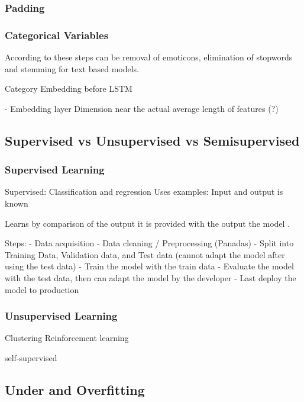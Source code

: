 \subsubsection{Padding}


\subsubsection{Categorical Variables}

According to \cite{alam2019impact} these steps can be removal of emoticons, elimination of stopwords and stemming for text based models.

Category Embedding before LSTM


- Embedding layer
Dimension near the actual average length of features (?)

\subsection{Supervised vs Unsupervised vs Semisupervised}

\subsubsection{Supervised Learning}
Supervised: Classification and regression
Uses  examples: Input and output is known

Learns by comparison of the output it is provided with the output the model .

Steps:
- Data acquisition
- Data cleaning / Preprocessing (Panadas)
- Split into Training Data, Validation data, and Test data (cannot adapt the model after using the test data)
- Train the model with the train data
- Evaluate the model with the test data, then can adapt the model by the developer
- Last deploy the model to production

\subsubsection{Unsupervised Learning}
Clustering
Reinforcement learning

self-supervised

\subsection{Under and Overfitting}

